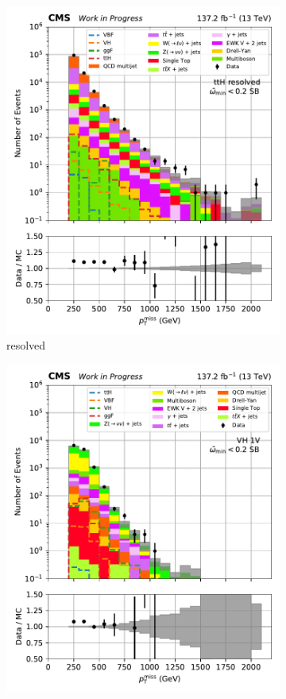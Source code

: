 \begin{figure}[htbp]
\begin{subfigure}[b]{0.24\textwidth}
        \includegraphics[width=\textwidth]{figures/region_plots/2016to18/sideband_3/ttH_resolved.pdf}
        \caption{\ttH resolved}
    \end{subfigure}
    \begin{subfigure}[b]{0.24\textwidth}
        \includegraphics[width=\textwidth]{figures/region_plots/2016to18/sideband_3/VH_1V.pdf}

\end{subfigure}
\end{figure}
